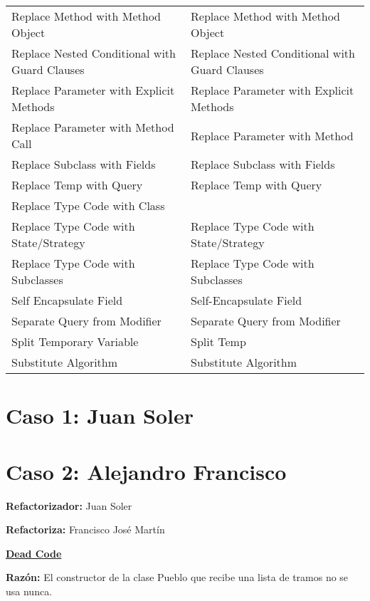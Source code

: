 \documentclass[11pt,a4paper,oneside]{book}
\begin{document}
\begin{longtable}{|p{200pt}|p{200pt}|}
    Replace Method with Method Object & Replace Method with Method Object\\ 
    Replace Nested Conditional with Guard Clauses & Replace Nested Conditional with Guard Clauses\\ 
    Replace Parameter with Explicit Methods & Replace Parameter with Explicit Methods\\ 
    Replace Parameter with Method Call & Replace Parameter with Method\\ 
    Replace Subclass with Fields & Replace Subclass with Fields\\ 
    Replace Temp with Query & Replace Temp with Query\\ 
    Replace Type Code with Class & \\ 
    Replace Type Code with State/Strategy & Replace Type Code with State/Strategy\\ 
    Replace Type Code with Subclasses & Replace Type Code with Subclasses\\ 
    Self Encapsulate Field & Self-Encapsulate Field\\ 
    Separate Query from Modifier & Separate Query from Modifier\\ 
    Split Temporary Variable & Split Temp\\ 
    Substitute Algorithm &     Substitute Algorithm\\
\end{longtable}





\chapter{Caso 1: Juan Soler}


\chapter{Caso 2: Alejandro Francisco}
\textbf{Refactorizador:} Juan Soler

\textbf{Refactoriza:} Francisco José Martín \newline
%
%

    \hyperref[DeadCode]{\textbf{Dead Code}}
    
    \textbf{Razón:} El constructor de la clase Pueblo que recibe una lista de tramos no se usa nunca.
    
\end{document}
